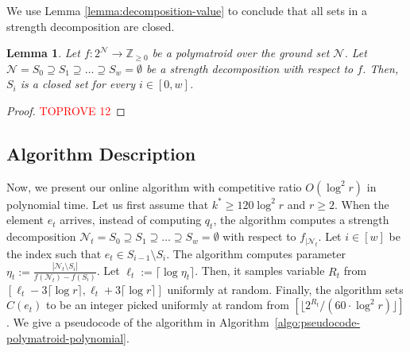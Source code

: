 \documentclass[11pt]{article}
\newtheorem{lemma}{Lemma}
\theoremstyle{definition}
\newcommand{\calN}{{\mathcal{N}}}
\begin{document}
We use Lemma \ref{lemma:decomposition-value} to conclude that all sets in a strength decomposition are closed. 

\begin{lemma}\label{lemma:decomposition-closed-set}
    Let $f:2^\mathcal{N}\rightarrow \mathbb{Z}_{\geq 0}$ be a polymatroid over the ground set $\mathcal{N}$. Let $\calN=S_0\supseteq S_1\supseteq \ldots \supseteq S_{w}=\emptyset$ be a strength decomposition with respect to $f$. Then, $S_i$ is a closed set for every $i\in [0,w]$.
\end{lemma}
\begin{proof}\textcolor{red}{TOPROVE 12}\end{proof}

\subsection{Algorithm Description}
Now, we present our online algorithm with competitive ratio $O(\log^2 r)$ in polynomial time. Let us first assume that $k^*\geq 120\log^2 r$ and $r\geq 2$. When the element $e_t$ arrives, instead of computing $q_t$, the algorithm computes a strength decomposition $\calN_t=S_0\supseteq S_1\supseteq \ldots \supseteq S_{w}=\emptyset$ with respect to $f_{|\mathcal{N}_t}$. Let $i\in [w]$ be the index such that $e_t\in S_{i-1}\setminus S_i$. The algorithm computes parameter $\eta_t:=\frac{|\mathcal{N}_t\setminus S_i|}{f(\mathcal{N}_t)-f(S_i)}$. Let $\ell_t:=\lceil \log \eta_t\rceil$. Then, it samples variable $R_t$ from $[\ell_t-3\lceil\log r\rceil, \ell_t+3\lceil\log r\rceil]$ uniformly at random. Finally, the algorithm sets $C(e_t)$ to be an integer picked uniformly at random from $[\lfloor 2^{R_t}/(60\cdot \log ^2 r)\rfloor]$. We give a pseudocode of the algorithm in Algorithm~\ref{algo:pseudocode-polymatroid-polynomial}.
\end{document}
